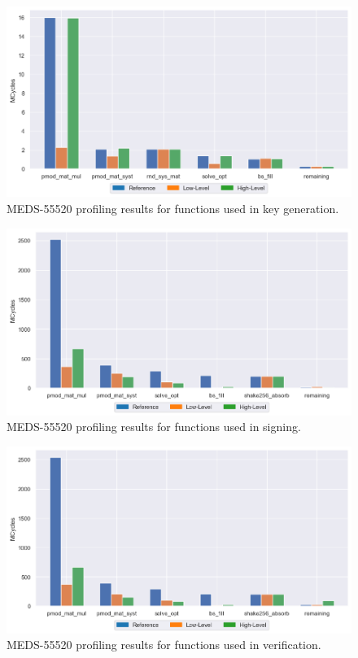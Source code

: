 \documentclass[11pt,a4paper]{report}
\theoremstyle{definition}
\begin{document}
\begin{figure}
  \centering
  \includegraphics[width=\textwidth]{plots/barplot_MEDS-55520_profile_keygen.png}
  \caption{MEDS-55520 profiling results for functions used in key generation.}
  \label{fig:results_profile_keygen_MEDS-55520}
\end{figure}

\begin{figure}
  \centering
  \includegraphics[width=\textwidth]{plots/barplot_MEDS-55520_profile_sign.png}
  \caption{MEDS-55520 profiling results for functions used in signing.}
  \label{fig:results_profile_signing_MEDS-55520}
\end{figure}

\begin{figure}
  \centering
  \includegraphics[width=\textwidth]{plots/barplot_MEDS-55520_profile_verify.png}
  \caption{MEDS-55520 profiling results for functions used in verification.}
  \label{fig:results_profile_verify_MEDS-55520}
\end{figure}
\end{document}
